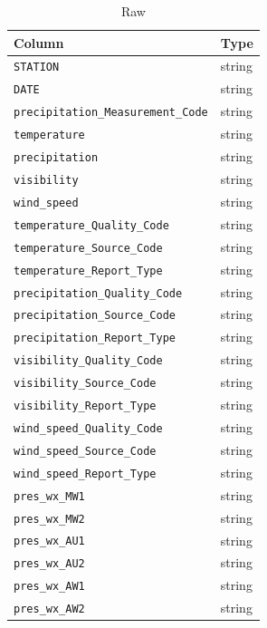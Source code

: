 \documentclass[11pt]{article}
\newcommand{\col}[1]{\texttt{#1}}
\begin{document}
\begin{table}[H]
\centering
\caption{Raw}
\begin{tabular}{ll}
\toprule
Column & Type \\
\midrule
\col{STATION} & string \\
\col{DATE} & string \\
\col{precipitation\_Measurement\_Code} & string \\
\col{temperature} & string \\
\col{precipitation} & string \\
\col{visibility} & string \\
\col{wind\_speed} & string \\
\col{temperature\_Quality\_Code} & string \\
\col{temperature\_Source\_Code} & string \\
\col{temperature\_Report\_Type} & string \\
\col{precipitation\_Quality\_Code} & string \\
\col{precipitation\_Source\_Code} & string \\
\col{precipitation\_Report\_Type} & string \\
\col{visibility\_Quality\_Code} & string \\
\col{visibility\_Source\_Code} & string \\
\col{visibility\_Report\_Type} & string \\
\col{wind\_speed\_Quality\_Code} & string \\
\col{wind\_speed\_Source\_Code} & string \\
\col{wind\_speed\_Report\_Type} & string \\
\col{pres\_wx\_MW1} & string \\
\col{pres\_wx\_MW2} & string \\
\col{pres\_wx\_AU1} & string \\
\col{pres\_wx\_AU2} & string \\
\col{pres\_wx\_AW1} & string \\
\col{pres\_wx\_AW2} & string \\
\bottomrule
\end{tabular}
\end{table}

\newpage
\end{document}
